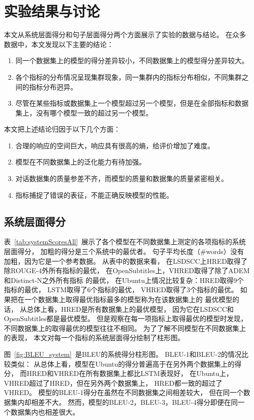 \chapter{实验结果与讨论}\label{ch:experiment}
本文从系统层面得分和句子层面得分两个方面展示了实验的数据与结论。
在众多数据中，本文发现以下主要的结论：
\begin{enumerate}
    \item 同一个数据集上的模型的得分差异较小，不同数据集上的模型得分差异较大。
    \item 各个指标的分布情况呈现集群现象，同一集群内的指标分布相似，不同集群之间的指标分布迥异。
    \item 尽管在某些指标或数据集上一个模型超过另一个模型，但是在全部指标和数据集上，没有哪个模型一致的超过另一个模型。
\end{enumerate}
本文把上述结论归因于以下几个方面：
\begin{enumerate}
    \item 合理的响应的空间巨大，响应具有很高的熵，给评价增加了难度。
    \item 模型在不同数据集上的泛化能力有待加强。
    \item 对话数据集的质量参差不齐，而模型的质量和数据集的质量紧密相关。
    \item 指标捕捉了错误的表征，不能正确反映模型的性能。
\end{enumerate}

\section{系统层面得分}\label{sec:system_scores}
表~\ref{tab:systemScoresAll}~展示了各个模型在不同数据集上测定的各项指标的系统层面得分，
加粗的得分是三个系统中的最优者。
句子平均长度（\#words）没有加粗，因为它是一个参考数据。
从表中的数据来看，
在LSDSCC上HRED取得了除ROUGE-4外所有指标的最优，
在OpenSubtitles上，VHRED取得了除了ADEM和Distinct-N之外所有指标
的最优，
在Ubuntu上情况比较复杂：HRED取得9个指标的最优，
LSTM取得了6个指标的最优，
VHRED取得了3个指标的最优。
如果把在一个数据集上取得最优指标最多的模型称为在该数据集上的
最优模型的话，
从总体上看，HRED是所有数据集上的最优模型，
因为它在LSDSCC和OpenSubtitles都是最优模型。
但是观察在每一项指标上取得最优的模型时发现，
不同数据集上的取得最优的模型往往不相同。
为了了解不同模型在不同数据集上的表现，
本文对每一个指标的系统层面得分绘制了柱形图。


图~\ref{fig:BLEU_system}~是BLEU的系统得分柱形图。
BLEU-1和BLEU-2的情况比较类似：
从总体上看，模型在Ubuntu的得分普遍高于在另外两个数据集上的得分，
而HRED和VHRED在所有数据集上都比LSTM表现好，
在Ubuntu上，VHRED超过了HRED，但在另外两个数据集上，
HRED都一致的超过了VHRED。
模型的BLEU-1得分在虽然在不同数据集之间相差较大，
但在同一个数据集内却相差不大。
然而，模型的BLEU-2，BLEU-3，BLEU-4得分即便在同一个数据集内也相差很大。

